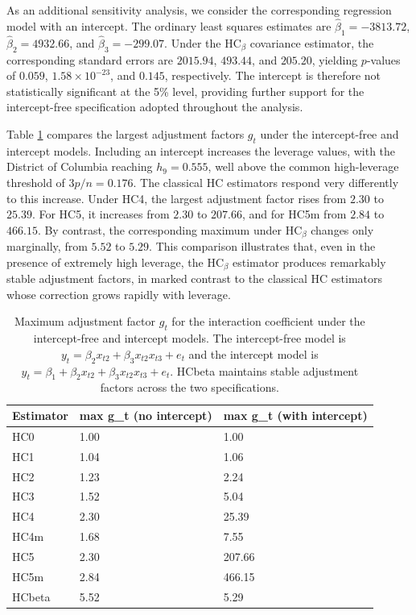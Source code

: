 As an additional sensitivity analysis, we consider the corresponding regression model with an intercept. The ordinary least squares estimates are \(\hat{\beta}_1 = -3813.72\), \(\hat{\beta}_2 = 4932.66\), and \(\hat{\beta}_3 = -299.07\). Under the \(\text{HC}_\beta\) covariance estimator, the corresponding standard errors are \(2015.94\), \(493.44\), and \(205.20\), yielding \(p\)-values of \(0.059\), \(1.58 \times 10^{-23}\), and \(0.145\), respectively. The intercept is therefore not statistically significant at the 5\% level, providing further support for the intercept-free specification adopted throughout the analysis.

Table \ref{tab:gt-comparison} compares the largest adjustment factors \(g_t\) under the intercept-free and intercept models. Including an intercept increases the leverage values, with the District of Columbia reaching \(h_9 = 0.555\), well above the common high-leverage threshold of \(3p/n = 0.176\). The classical HC estimators respond very differently to this increase. Under HC4, the largest adjustment factor rises from \(2.30\) to \(25.39\). For HC5, it increases from \(2.30\) to \(207.66\), and for HC5m from \(2.84\) to \(466.15\). By contrast, the corresponding maximum under \(\text{HC}_\beta\) changes only marginally, from \(5.52\) to \(5.29\). This comparison illustrates that, even in the presence of extremely high leverage, the \(\text{HC}_\beta\) estimator produces remarkably stable adjustment factors, in marked contrast to the classical HC estimators whose correction grows rapidly with leverage.

\begin{table}

\caption{\label{tab:gt-comparison}Maximum adjustment factor $g_t$ for the interaction coefficient under the intercept-free and intercept models. The intercept-free model is $y_t = \beta_2 x_{t2} + \beta_3 x_{t2} x_{t3} + e_t$ and the intercept model is $y_t = \beta_1 + \beta_2 x_{t2} + \beta_3 x_{t2} x_{t3} + e_t$. HCbeta maintains stable adjustment factors across the two specifications.}
\centering
\begin{tabular}[t]{lll}
\toprule
Estimator & max g\_t (no intercept) & max g\_t (with intercept)\\
\midrule
HC0 & 1.00 & 1.00\\
HC1 & 1.04 & 1.06\\
HC2 & 1.23 & 2.24\\
HC3 & 1.52 & 5.04\\
HC4 & 2.30 & 25.39\\
\addlinespace
HC4m & 1.68 & 7.55\\
HC5 & 2.30 & 207.66\\
HC5m & 2.84 & 466.15\\
HCbeta & 5.52 & 5.29\\
\bottomrule
\end{tabular}
\end{table}

